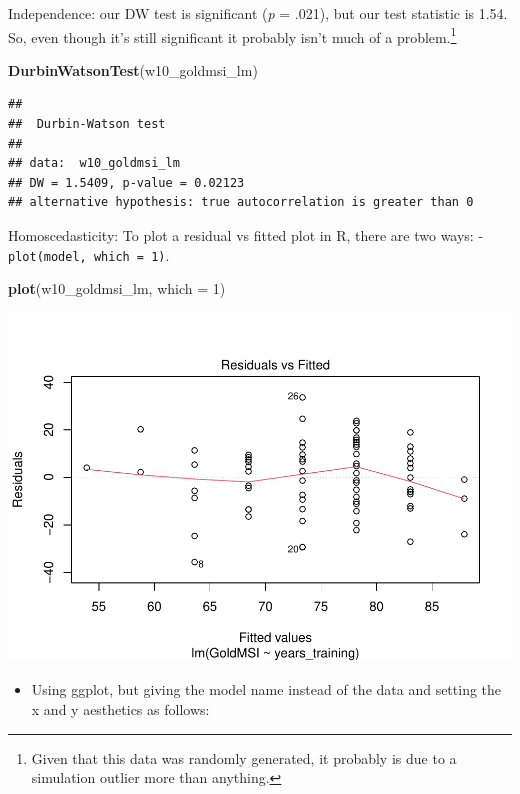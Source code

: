 \documentclass[
]{book}
\newenvironment{Shaded}{\begin{snugshade}}{\end{snugshade}}
\newcommand{\AttributeTok}[1]{\textcolor[rgb]{0.13,0.29,0.53}{#1}}
\newcommand{\DecValTok}[1]{\textcolor[rgb]{0.00,0.00,0.81}{#1}}
\newcommand{\FunctionTok}[1]{\textcolor[rgb]{0.13,0.29,0.53}{\textbf{#1}}}
\newcommand{\NormalTok}[1]{#1}
\providecommand{\tightlist}{%
  \setlength{\itemsep}{0pt}\setlength{\parskip}{0pt}}
\begin{document}
Independence: our DW test is significant (\emph{p} = .021), but our test statistic is 1.54. So, even though it's still significant it probably isn't much of a problem.\footnote{Given that this data was randomly generated, it probably is due to a simulation outlier more than anything.}

\begin{Shaded}
\begin{Highlighting}[]
\FunctionTok{DurbinWatsonTest}\NormalTok{(w10\_goldmsi\_lm)}
\end{Highlighting}
\end{Shaded}

\begin{verbatim}
## 
##  Durbin-Watson test
## 
## data:  w10_goldmsi_lm
## DW = 1.5409, p-value = 0.02123
## alternative hypothesis: true autocorrelation is greater than 0
\end{verbatim}

Homoscedasticity: To plot a residual vs fitted plot in R, there are two ways:
- \texttt{plot(model,\ which\ =\ 1)}.

\begin{Shaded}
\begin{Highlighting}[]
\FunctionTok{plot}\NormalTok{(w10\_goldmsi\_lm, }\AttributeTok{which =} \DecValTok{1}\NormalTok{)}
\end{Highlighting}
\end{Shaded}

\includegraphics{_main_files/figure-latex/unnamed-chunk-212-1.pdf}

\begin{itemize}
\tightlist
\item
  Using ggplot, but giving the model name instead of the data and setting the x and y aesthetics as follows:
\end{itemize}
\end{document}
